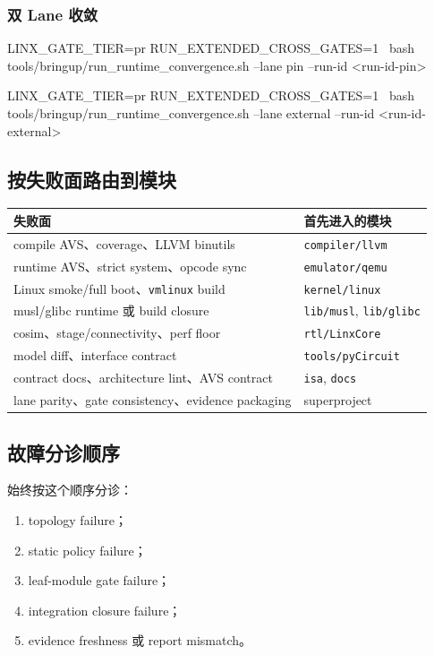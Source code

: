 \documentclass[UTF8,11pt,a4paper]{ctexart}
\begin{document}
\subsubsection{双 Lane 收敛}

\begin{CodeBlock}
LINX_GATE_TIER=pr RUN_EXTENDED_CROSS_GATES=1 \
bash tools/bringup/run_runtime_convergence.sh --lane pin --run-id <run-id-pin>

LINX_GATE_TIER=pr RUN_EXTENDED_CROSS_GATES=1 \
bash tools/bringup/run_runtime_convergence.sh --lane external --run-id <run-id-external>
\end{CodeBlock}

\subsection{按失败面路由到模块}

\begin{longtable}{>{\raggedright\arraybackslash}p{} >{\raggedright\arraybackslash}p{}}
\toprule
失败面 & 首先进入的模块 \\
\midrule
\endhead
compile AVS、coverage、LLVM binutils & \texttt{compiler/llvm} \\
runtime AVS、strict system、opcode sync & \texttt{emulator/qemu} \\
Linux smoke/full boot、\texttt{vmlinux} build & \texttt{kernel/linux} \\
musl/glibc runtime 或 build closure & \texttt{lib/musl}, \texttt{lib/glibc} \\
cosim、stage/connectivity、perf floor & \texttt{rtl/LinxCore} \\
model diff、interface contract & \texttt{tools/pyCircuit} \\
contract docs、architecture lint、AVS contract & \texttt{isa}, \texttt{docs} \\
lane parity、gate consistency、evidence packaging & superproject \\
\bottomrule
\end{longtable}

\subsection{故障分诊顺序}

始终按这个顺序分诊：

\begin{enumerate}
  \item topology failure；
  \item static policy failure；
  \item leaf-module gate failure；
  \item integration closure failure；
  \item evidence freshness 或 report mismatch。
\end{enumerate}
\end{document}
